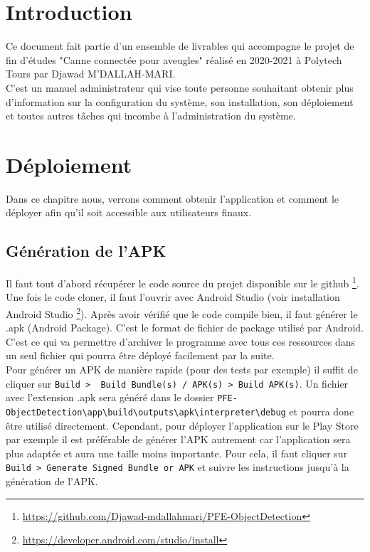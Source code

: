\documentclass[UTF8]{EPURapport}
\begin{document}
\chapter{Introduction}

Ce document fait partie d'un ensemble de livrables qui accompagne le projet de fin d'études "Canne connectée pour aveugles" réalisé en 2020-2021 à Polytech Tours par Djawad M'DALLAH-MARI.\\

C'est un manuel administrateur qui vise toute personne souhaitant obtenir plus d'information sur la configuration du système, son installation, son déploiement et toutes autres tâches qui incombe à l'administration du système.

\chapter{Déploiement}
Dans ce chapitre nous, verrons comment obtenir l'application et comment le déployer afin qu'il soit accessible aux utilisateurs finaux.

\section{Génération de l'APK}\label{genapk}

Il faut tout d'abord récupérer le code source du projet disponible sur le github \footnote{\url{https://github.com/Djawad-mdallahmari/PFE-ObjectDetection}}. Une fois le code cloner, il faut l'ouvrir avec Android Studio (voir installation Android Studio \footnote{\url{https://developer.android.com/studio/install}}). Après avoir vérifié que le code compile bien, il faut générer le .apk (Android Package). C'est le format de fichier de package utilisé par Android. C'est ce qui va permettre d'archiver le programme avec tous ces ressources dans un seul fichier qui pourra être déployé facilement par la suite.\\
Pour générer un APK de manière rapide (pour des tests par exemple) il suffit de cliquer sur \verb|Build >  Build Bundle(s) / APK(s) > Build APK(s)|. Un fichier avec l'extension .apk sera généré dans le dossier \verb|PFE-ObjectDetection\app\build\outputs\apk\interpreter\debug| et pourra donc être utilisé directement. Cependant, pour déployer l'application sur le Play Store par exemple il est préférable de générer l'APK autrement car l'application sera plus adaptée et aura une taille moins importante. Pour cela, il faut cliquer sur \verb|Build > Generate Signed Bundle or APK| et suivre les instructions jusqu'à la génération de l'APK.
\end{document}
